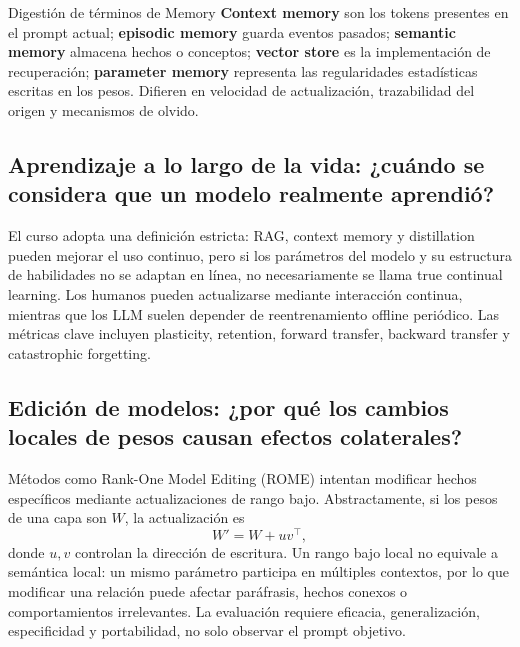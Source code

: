\begin{knowledgebox}{Digestión de términos de Memory}
\textbf{Context memory} son los tokens presentes en el prompt actual; \textbf{episodic memory} guarda eventos pasados; \textbf{semantic memory} almacena hechos o conceptos; \textbf{vector store} es la implementación de recuperación; \textbf{parameter memory} representa las regularidades estadísticas escritas en los pesos. Difieren en velocidad de actualización, trazabilidad del origen y mecanismos de olvido.
\end{knowledgebox}

\subsection{Aprendizaje a lo largo de la vida: ¿cuándo se considera que un modelo realmente aprendió?}

El curso adopta una definición estricta: RAG, context memory y distillation pueden mejorar el uso continuo, pero si los parámetros del modelo y su estructura de habilidades no se adaptan en línea, no necesariamente se llama true continual learning. Los humanos pueden actualizarse mediante interacción continua, mientras que los LLM suelen depender de reentrenamiento offline periódico. Las métricas clave incluyen plasticity, retention, forward transfer, backward transfer y catastrophic forgetting.




\subsection{Edición de modelos: ¿por qué los cambios locales de pesos causan efectos colaterales?}

Métodos como Rank-One Model Editing (ROME) intentan modificar hechos específicos mediante actualizaciones de rango bajo. Abstractamente, si los pesos de una capa son $W$, la actualización es
\[
W'=W+uv^{\top},
\]
donde $u,v$ controlan la dirección de escritura. Un rango bajo local no equivale a semántica local: un mismo parámetro participa en múltiples contextos, por lo que modificar una relación puede afectar paráfrasis, hechos conexos o comportamientos irrelevantes. La evaluación requiere eficacia, generalización, especificidad y portabilidad, no solo observar el prompt objetivo.

